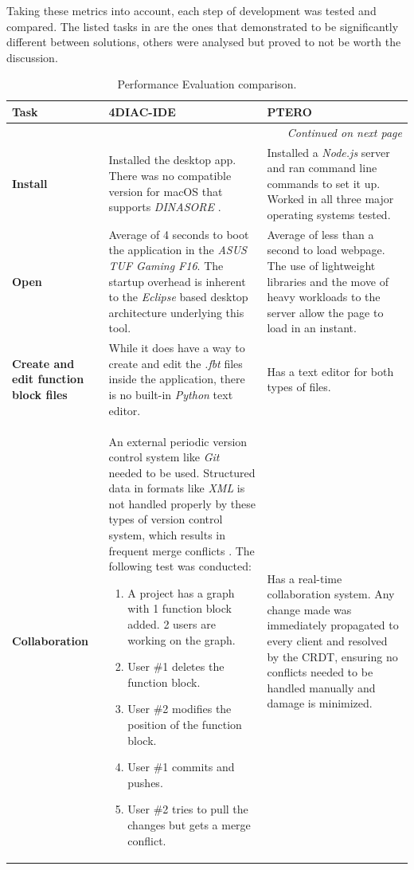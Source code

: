 Taking these metrics into account, each step of development was tested and compared. The listed tasks in  are the ones that demonstrated to be significantly different between solutions, others were analysed but proved to not be worth the discussion.

\begin{longtable}{p{2.5cm}p{6cm}p{5.5cm}}
\caption{Performance Evaluation comparison.} \label{tab:performance-evaluation} \\
\hline
\textbf{Task} & \textbf{4DIAC-IDE} & \textbf{PTERO} \\ \hline
\endhead

\hline
\multicolumn{3}{r}{\textit{Continued on next page}} \\
\endfoot
\hline
\endfoot
\endlastfoot

\textbf{Install} &
Installed the desktop app. There was no compatible version for macOS that supports \textit{DINASORE} \cite{noauthor_digi2-feupdinasore_2026}. &
Installed a \textit{Node.js} server and ran command line commands to set it up. Worked in all three major operating systems tested. \\ \hline

\textbf{Open} &
Average of 4 seconds to boot the application in the \textit{ASUS TUF Gaming F16}. The startup overhead is inherent to the \textit{Eclipse} based desktop architecture underlying this tool. &
Average of less than a second to load webpage. The use of lightweight libraries and the move of heavy workloads to the server allow the page to load in an instant. \\ \hline

\textbf{Create and edit function block files} &
While it does have a way to create and edit the \textit{.fbt} files inside the application, there is no built-in \textit{Python} text editor. &
Has a text editor for both types of files. \\ \hline

\textbf{Collaboration} &
An external periodic version control system like \textit{Git} needed to be used. Structured data in formats like \textit{XML} is not handled properly by these types of version control system, which results in frequent merge conflicts \cite{axelsson_version_2015}. The following test was conducted:
\begin{enumerate}[leftmargin=*,nosep]
\item A project has a graph with 1 function block added. 2 users are working on the graph.
\item User \#1 deletes the function block.
\item User \#2 modifies the position of the function block.
\item User \#1 commits and pushes.
\item User \#2 tries to pull the changes but gets a merge conflict.
\end{enumerate} &
Has a real-time collaboration system. Any change made was immediately propagated to every client and resolved by the \ac{CRDT}, ensuring no conflicts needed to be handled manually and damage is minimized. \\ \hline


\end{longtable}
